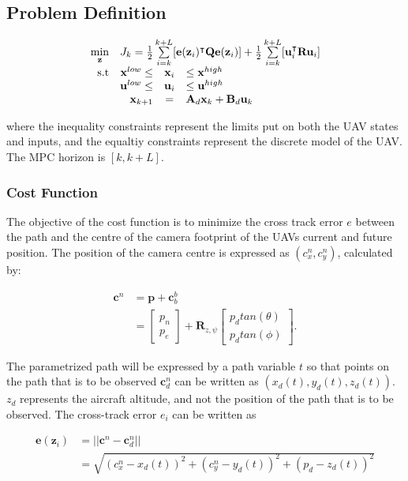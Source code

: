 \subsection*{Problem Definition}

\begin{equation}
	\begin{array}{rrclcl}
		\displaystyle \min_{\mathbf{z}} & \multicolumn{3}{l}{J_k = \frac{1}{2} \sum\limits_{i=k}^{k+L} [\mathbf{e}(\mathbf{z}_i)^\intercal \mathbf{Q} \mathbf{e}(\mathbf{z}_i)] + \frac{1}{2} \sum\limits_{i=k}^{k+L} [\mathbf{u}_i^\intercal \mathbf{R} \mathbf{u}_i]}\\
		\textrm{s.t}
		& \mathbf{x}^{low} \leq & \mathbf{x}_i & \leq \mathbf{x}^{high} \\
		& \mathbf{u}^{low} \leq & \mathbf{u}_i & \leq \mathbf{u}^{high} \\
		& \displaystyle \mathbf{x}_{k+1} & = & \mathbf{A}_d \mathbf{x}_k + \mathbf{B}_d \mathbf{u}_k
	\end{array}
\end{equation}

where the inequality constraints represent the limits put on both the UAV states and inputs, and the equaltiy constraints represent the discrete model of the UAV. The MPC horizon is $[k, k+L]$.


\subsubsection*{Cost Function}

The objective of the cost function is to minimize the cross track error $e$ between the path and the centre of the camera footprint of the UAVs current and future position. The position of the camera centre is expressed as $(c_x^n, c_y^n)$, calculated by:

\begin{equation}
\begin{split}
	\mathbf{c}^n & = \mathbf{p} + \mathbf{c}_b^b \\
	& =
	\begin{bmatrix}
		p_n \\ p_e
	\end{bmatrix}
	+ \mathbf{R}_{z,\psi}
	\begin{bmatrix}
		p_d tan(\theta) \\ p_d tan(\phi)
	\end{bmatrix}.
\end{split}
\end{equation}

The parametrized path will be expressed by a path variable $t$ so that points on the path that is to be observed $\mathbf{c}_d^n$ can be written as $(x_d(t), y_d(t), z_d(t))$. $z_d$ represents the aircraft altitude, and not the position of the path that is to be observed. The cross-track error $e_i$ can be written as

\begin{equation}
\begin{split}
	\mathbf{e}(\mathbf{z}_i) & = ||\mathbf{c}^n - \mathbf{c}^n_d|| \\
	& = \sqrt{(c_x^n - x_d(t))^2 + (c_y^n - y_d(t))^2 + (p_d - z_d(t))^2}
\end{split}
\end{equation}